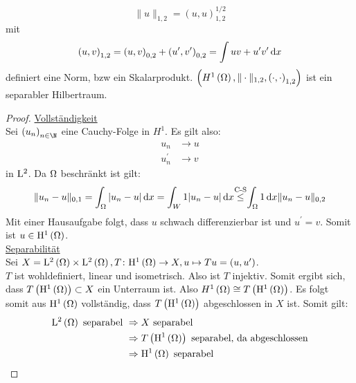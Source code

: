 \begin{lemma}[Satz]
	\begin{equation*}
		\|u\|_{1,2} = \left(u,u\right)_{1,2}^{1/2}
	\end{equation*}
	mit
	\begin{equation*}
		\left(u,v\right)_{1,2} = \left(u,v\right)_{0,2} + \left(u^{\prime},v^{\prime}\right)_{0,2} = \int uv+u^{\prime}v^{\prime}\,\mathrm{d} x
	\end{equation*}
	definiert eine Norm, bzw ein Skalarprodukt. $\left(H^{1}\left(\Omega\right),\|\cdot\|_{1,2},\left(\cdot,\cdot\right)_{1,2}\right)$ ist ein separabler Hilbertraum.
\end{lemma}
\begin{proof}
	\underline{Vollständigkeit}\\
	Sei $\left(u_{n}\right)_{n\in\N}$ eine Cauchy-Folge in $H^{1}$. Es gilt also:
	\begin{align*}
		u_{n}&\to u\\
		u^{\prime}_{n} &\to v
	\end{align*}
	in $\mathrm{L}^{2}$. Da $\Omega$ beschränkt ist gilt:
	\begin{equation*}
		\|u_{n}-u\|_{0,1} = \int_{\W}|u_{n}-u|\d x = \int_{W}1|u_{n}-u|\d x \overset{\mathclap{\text{C-S}}}{\leq} \int_{\W} 1\d x \|u_{n}-u\|_{0,2}
	\end{equation*}
	Mit einer Hausaufgabe folgt, dass $u$ schwach differenzierbar ist und $u^{\prime}=v$. Somit ist $u\in\mathrm{H}^{1}\left(\Omega\right)$.\\
	\underline{Separabilität}\\
	Sei $X=\mathrm{L}^{2}\left(\Omega\right)\times\mathrm{L}^{2}\left(\Omega\right), T\colon \mathrm{H}^{1}\left(\Omega\right)\to X, u\mapsto Tu=\left(u,u^{\prime}\right)$.\\
	$T$ ist wohldefiniert, linear und isometrisch. Also ist $T$ injektiv. Somit ergibt sich, dass $T\left(\mathrm{H}^{1}\left(\Omega\right)\right)\subset X$ ein Unterraum ist. Also $H^{1}\left(\Omega\right)\cong T\left(\mathrm{H}^{1}\left(\Omega\right)\right)$. Es folgt somit aus $\mathrm{H}^{1}\left(\Omega\right)$ vollständig, dass $T\left(\mathrm{H}^{1}\left(\Omega\right)\right)$ abgeschlossen in $X$ ist. Somit gilt:
	\begin{align*}
		\mathrm{L}^{2}\left(\Omega\right)\text{ separabel } &\Rightarrow X\text{ separabel}\\
			&\Rightarrow T\left(\mathrm{H}^{1}\left(\Omega\right)\right)\text{ separabel, da abgeschlossen}\\
			&\Rightarrow \mathrm{H}^{1}\left(\Omega\right)\text{ separabel}
	\end{align*}
\end{proof}
